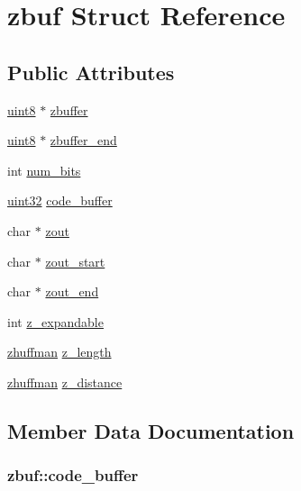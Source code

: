\hypertarget{structzbuf}{}\section{zbuf Struct Reference}
\label{structzbuf}
\subsection*{Public Attributes}
\begin{DoxyCompactItemize}
\item 
\hyperlink{stb__image_8c_adde6aaee8457bee49c2a92621fe22b79}{uint8} $\ast$ \hyperlink{structzbuf_a7080eb91dcc67e1dfe818d08e6f22c4e}{zbuffer}
\item 
\hyperlink{stb__image_8c_adde6aaee8457bee49c2a92621fe22b79}{uint8} $\ast$ \hyperlink{structzbuf_af030baa17bebedd18272678da17a33f4}{zbuffer\+\_\+end}
\item 
int \hyperlink{structzbuf_acd069cdb4100884a732ad2794edbbdff}{num\+\_\+bits}
\item 
\hyperlink{stb__image_8c_a1134b580f8da4de94ca6b1de4d37975e}{uint32} \hyperlink{structzbuf_a3bb8244d7be17801079c5a8587182edb}{code\+\_\+buffer}
\item 
char $\ast$ \hyperlink{structzbuf_aaf137c25fa5b9fb14e92354da4203c38}{zout}
\item 
char $\ast$ \hyperlink{structzbuf_af31571e8d74c78c9bb18d92205150b28}{zout\+\_\+start}
\item 
char $\ast$ \hyperlink{structzbuf_af07c0b7b7227f670ee1413bc0dcab791}{zout\+\_\+end}
\item 
int \hyperlink{structzbuf_ae662f24e0973ca19b543e64647a6bfb6}{z\+\_\+expandable}
\item 
\hyperlink{structzhuffman}{zhuffman} \hyperlink{structzbuf_a5906bdbe9dfb565339acac51af9efe89}{z\+\_\+length}
\item 
\hyperlink{structzhuffman}{zhuffman} \hyperlink{structzbuf_ae7d9588b2548708e14f3c6ad89bf26b5}{z\+\_\+distance}
\end{DoxyCompactItemize}


\subsection{Member Data Documentation}
\hypertarget{structzbuf_a3bb8244d7be17801079c5a8587182edb}{}
\subsubsection[{code\+\_\+buffer}]{ zbuf\+::code\+\_\+buffer}\label{structzbuf_a3bb8244d7be17801079c5a8587182edb}
\hypertarget{structzbuf_acd069cdb4100884a732ad2794edbbdff}{}
